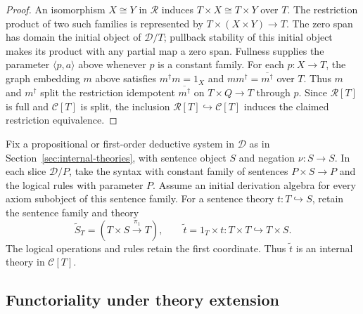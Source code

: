 \begin{proof}
An isomorphism $X\cong Y$ in $\mathscr R$ induces
$T\times X\cong T\times Y$ over $T$. The restriction product of two
such families is represented by $T\times(X\times Y)\to T$.
The zero span has domain the initial object of $\mathcal D/T$;
pullback stability of this initial object makes its product with any
partial map a zero span. Fullness supplies the parameter
$\langle p,a\rangle$ above whenever $p$ is a constant family.
For each $p:X\to T$, the graph embedding $m$ above satisfies
$m^\dagger m=1_X$ and $mm^\dagger=\overline{m^\dagger}$ over $T$.
Thus $m$ and $m^\dagger$ split the restriction idempotent
$\overline{m^\dagger}$ on $T\times Q\to T$ through $p$.
Since $\mathscr R[T]$ is full and $\mathscr C[T]$ is split,
the inclusion $\mathscr R[T]\hookrightarrow\mathscr C[T]$ induces
the claimed restriction equivalence.
\end{proof}

Fix a propositional or first-order deductive system in $\mathcal D$
as in Section~\ref{sec:internal-theories}, with sentence object $S$
and negation $\nu:S\to S$. In each slice $\mathcal D/P$, take the
syntax with constant family of sentences $P\times S\to P$ and the
logical rules with parameter $P$. Assume an initial derivation algebra
for every axiom subobject of this sentence family.
For a sentence theory $t:T\hookrightarrow S$, retain the sentence
family and theory
\[
 \widetilde S_T=(T\times S\xrightarrow{\pi_1}T),\qquad
 \widetilde t=1_T\times t:T\times T\hookrightarrow T\times S.
\]
The logical operations and rules retain the first coordinate.
Thus $\widetilde t$ is an internal theory in $\mathscr C[T]$.

\subsection{Functoriality under theory extension}


